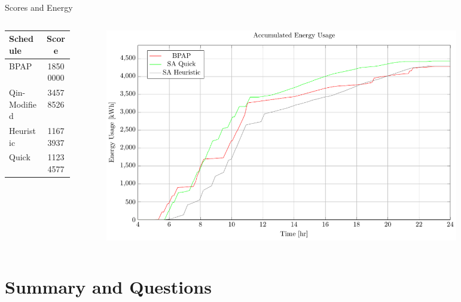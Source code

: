 \documentclass[aspectratio=169,dvipsnames]{beamer}
\begin{document}
\begin{frame}[label={sec:org3da51b6}]{Scores and Energy}
\begin{columns}
\begin{column}{0.35\columnwidth}
\begin{center}
\begin{tabular}{l|c}
\hline
Schedule & Score\\[0pt]
\hline
BPAP & \num{18500000}\\[0pt]
Qin-Modified & \num{34578526}\\[0pt]
Heuristic & \num{11673937}\\[0pt]
Quick & \num{11234577}\\[0pt]
\hline
\end{tabular}
\end{center}
\end{column}

\begin{column}{0.75\columnwidth}
\begin{figure}[htpb]
\centering
    \includegraphics[width=0.9\textwidth]{img/sa-pap-paper-good/energy-zoom}
\end{figure}
\end{column}
\end{columns}
\end{frame}

\section{Summary and Questions}
\label{sec:org7ce0ed7}
\begin{frame}[label={sec:org44d42dc}]{}
\tableofcontents[currentsection]
\end{frame}
\end{document}
